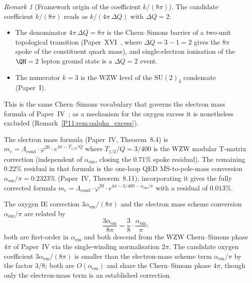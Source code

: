 \documentclass[11pt,a4paper]{article}
\theoremstyle{definition}
\theoremstyle{remark}
\newtheorem{remark}[theorem]{Remark}
\newcommand{\vp}{\varphi}
\newcommand{\Lcond}{\Lambda_{\mathrm{cond}}}
\newcommand{\aem}{\alpha_{\mathrm{em}}}
\begin{document}
\begin{remark}[Framework origin of the coefficient $k/(8\pi)$]
\label{P11:rem:k8pi_origin}
The candidate coefficient $k/(8\pi)$ reads as
$k/(4\pi\,\Delta Q)$ with $\Delta Q = 2$:
\begin{itemize}[noitemsep]
\item The denominator $4\pi\,\Delta Q = 8\pi$ is the Chern--Simons
  barrier of a two-unit topological transition
  (Paper~XVI~\cite{Paper16}, where $\Delta Q = 3-1 = 2$ gives the
  $8\pi$ spoke of the constituent quark mass), and single-electron
  ionisation of the $\QH=2$ lepton ground state is a $\Delta Q = 2$
  event.
\item The numerator $k=3$ is the WZW level of the $\mathrm{SU}(2)_3$
  condensate (Paper~I).
\end{itemize}
This is the same Chern--Simons vocabulary that governs the electron
mass formula of Paper~IV~\cite{Paper4}; as a mechanism for the oxygen
excess it is nonetheless excluded (Remark~\ref{P11:rem:oalpha_excess}).

The electron mass formula (Paper~IV, Theorem~8.4) %
is $m_e = \Lcond\cdot\vp^{20}\cdot e^{4\pi - T_{1/2}/Q}$
where $T_{1/2}/Q = 3/400$ is the WZW modular T-matrix correction
(independent of $\aem$, closing the $0.71\%$ spoke residual).
The remaining $0.22\%$ residual in that formula is the
one-loop QED $\overline{\mathrm{MS}}$-to-pole-mass conversion
$\aem/\pi = 0.2323\%$
(Paper~IV, Theorem~8.11); %
incorporating it gives the fully corrected formula
$m_e = \Lcond\cdot\vp^{20}\cdot e^{4\pi-3/400-\aem/\pi}$
with a residual of $0.013\%$.

The oxygen IE correction $3\aem/(8\pi)$ and the electron mass
scheme conversion $\aem/\pi$ are related by
\begin{equation}
  \frac{3\aem}{8\pi} = \frac{3}{8} \cdot \frac{\aem}{\pi}:
  \label{P11:eq:kalpharelation}
\end{equation}
both are first-order in $\aem$ and both descend from the
WZW Chern--Simons phase $4\pi$ of Paper~IV via the
single-winding normalisation $2\pi$.
The candidate oxygen coefficient $3\aem/(8\pi)$ is smaller than the
electron-mass scheme term $\aem/\pi$ by the factor $3/8$; both are
$O(\aem)$ and share the Chern--Simons phase $4\pi$, though only the
electron-mass term is an established correction.
\end{remark}
\end{document}
